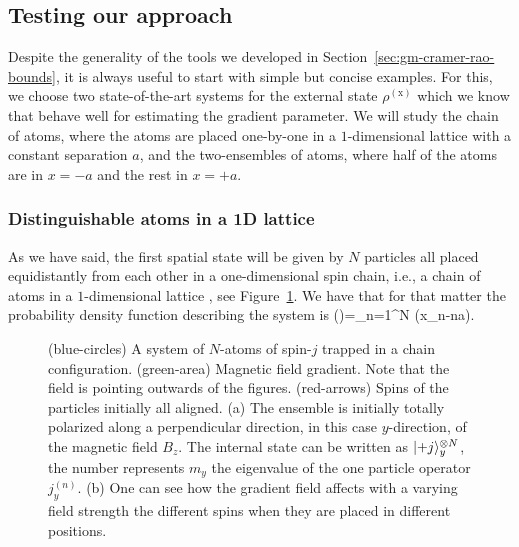\subsection{Testing our approach}
\label{sec:gm-io-chain-and-two-ensembles}

Despite the generality of the tools we developed in Section~\ref{sec:gm-cramer-rao-bounds}, it is always useful to start with simple but concise examples.
For this, we choose two state-of-the-art systems for the external state $\rho^{(\text{x})}$ which we know that behave well for estimating the gradient parameter.
We will study the chain of atoms, where the atoms are placed one-by-one in a $1$-dimensional lattice with a constant separation $a$, and the two-ensembles of atoms, where half of the atoms are in $x=-a$ and the rest in $x=+a$.

\subsubsection{Distinguishable atoms in a 1D lattice}

As we have said, the first spatial state will be given by $N$ particles all placed equidistantly from each other in a one-dimensional spin chain, i.e., a chain of atoms in a $1$-dimensional lattice
\cite{Altenburg2016},
see Figure~\ref{fig:ionchain-evolution}.
We have that for that matter the probability density function describing the system is
\be
  \prob()=\prod_{n=1}^N \delta(x_n-na).
\ee
\begin{figure}[htp]
  \begin{center}
    \caption[1-D chain of atoms polarized along $y$-axis under a gradient magnetic field]{
    (blue-circles) A system of $N$-atoms of spin-$j$ trapped in a chain configuration.
    (green-area) Magnetic field gradient.
    Note that the field is pointing outwards of the figures.
    (red-arrows) Spins of the particles initially all aligned.
    (a) The ensemble is initially totally polarized along a
    perpendicular direction, in this case $y$-direction, of the magnetic field $B_z$.
    The internal state can be written as $\vert{+j}\rangle_{y}^{\otimes N}$, the number represents $m_y$ the eigenvalue of the one particle operator $j_y^{(n)}$.
    (b) One can see how the gradient field affects with a varying field strength the different spins when they are placed in different positions. }
    \label{fig:ionchain-evolution}
  \end{center}
\end{figure}

